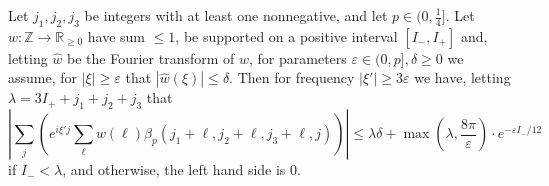 \documentclass[11pt]{article}
\theoremstyle{plain}
\newcommand{\eps}{\varepsilon}
\begin{document}
\begin{lemma}\label{lem:fourier-beta2}
Let $j_1,j_2,j_3$ be integers with at least one nonnegative, and let $p\in(0,\frac{1}{4}]$. Let $w:\mathbb{Z}\rightarrow\mathbb{R}_{\geq 0}$ have sum $\leq 1$, be supported on a positive interval $[I_-,I_+]$ and, letting $\hat{w}$ be the Fourier transform of $w$, for parameters $\eps\in(0,p], \delta\geq 0$ we assume, for $|\xi|\geq \eps$ that $|\hat{w}(\xi)|\leq \delta$. Then for frequency $|\xi'|\geq 3\eps$ we have, letting $\lambda=3I_++j_1+j_2+j_3$ that
\begin{equation}\label{eq:fourier-beta}
\left|\sum_j \left(e^{i\xi'j}\sum_\ell w(\ell)\beta_p(j_1+\ell,j_2+\ell,j_3+\ell,j)\right)\right|\leq \lambda\delta+\max(\lambda,\frac{8\pi}{\eps})\cdot e^{-\eps I_-/12}
\end{equation}
if $I_-<\lambda$, and otherwise, the left hand side is 0.
\end{lemma}
\end{document}
